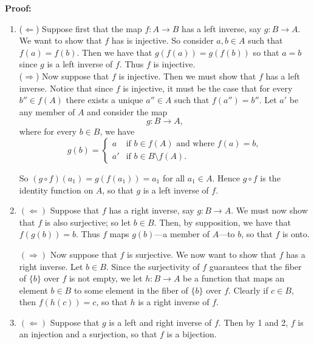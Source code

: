 \begin{enumerate}
      \textbf{Proof:}
      \begin{enumerate}
         \item ($\Leftarrow$) Suppose first that the map $f : A \rightarrow B$ 
               has a left inverse, say $g : B \rightarrow A$. We want to show 
               that $f$ has is injective. So consider $a, b \in A$ such that
               $f(a) = f(b)$. Then we have that $g(f(a)) = g(f(b))$ so that
               $a = b$ since $g$ is a left inverse of $f$. Thus $f$ is
               injective. \\
               ($\Rightarrow$) Now suppose that $f$ is injective. Then we must 
               show that $f$ has	a left inverse. Notice that since $f$ is 
               injective, it must be the case that for every $b'' \in f(A)$ 
               there exists a unique $a'' \in A$ such that $f(a'') = b''$. Let 
               $a'$ be any member of $A$ and consider the map
	            $$g : B \rightarrow A,$$
	            where for every $b \in B$, we have
	            \begin{equation*}
		            g(b) = \left\{
			            \begin{array}{ll}
				            a & \text{if } b \in f(A) \text{ and where } f(a) = b,\\
                        a' & \text{if } b \in B\setminus f(A).
                     \end{array} \right.
               \end{equation*}
   
               So $(g \circ f)(a_1) = g(f(a_1)) = a_1$ for all $a_1 \in A$.
               Hence $g \circ f$ is the identity function on $A$, so that $g$ is
               a left inverse of $f$.

         \item $(\Leftarrow)$ Suppose that $f$ has a right inverse, say
               $g : B \rightarrow A$. We must now show that $f$ is also 
               surjective; so let $b \in B$. Then, by supposition, we have that 
               $f(g(b)) = b$. Thus $f$ maps $g(b)$---a member of $A$---to $b$, 
               so that $f$ is onto.
   
               $(\Rightarrow)$ Now suppose that $f$ is surjective. We now want 
               to show that $f$ has a right inverse. Let $b \in B$. Since the 
               surjectivity of $f$ guarantees that the fiber of $\{b\}$ over $f$
               is not empty, we let $h : B \rightarrow A$ be a function that 
               maps an element $b \in B$ to some element in the fiber of $\{b\}$
               over $f$. Clearly if $c \in B$, then $f(h(c)) = c$, so that $h$ 
               is a right inverse of $f$.
         \item $(\Leftarrow)$ Suppose that $g$ is a left and right inverse of
               $f$. Then by 1 and 2, $f$ is an injection and a surjection, so 
               that $f$ is a bijection.
   

\end{enumerate}
\end{enumerate}
